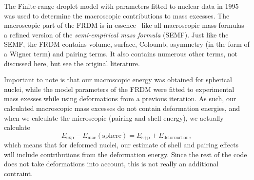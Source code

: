 The Finite-range droplet model with parameters fitted to nuclear data in 1995\cite{moller1995} was used to determine the macroscopic contributions to mass excesses. The macroscopic part of the FRDM is in essence-- like all macroscopic mass formulas-- a refined version of the \emph{semi-empirical mass formula} (SEMF). Just like the SEMF, the FRDM contains volume, surface, Coloumb, asymmetry (in the form of a Wigner term) and pairing terms. It also contains numerous other terms, not discussed here, but see the original literature\cite{moller1995}.

Important to note is that our macroscopic energy was obtained for spherical nuclei, while the model parameters of the FRDM were fitted to experimental mass exesses while using deformations from a previous iteration. As such, our calculated macroscopic mass excesses do not contain deformation energies, and when we calculate the microscopic (pairing and shell energy), we actually calculate
\begin{equation}
E_\text{exp} - E_\text{mac}(\text{sphere}) = E_{\text{s}+\text{p}} + E_\text{deformation},
\end{equation}
which means that for deformed nuclei, our estimate of shell and pairing effects will include contributions from the deformation energy.
Since the rest of the code does not take deformations into account, this is not really an additional contraint.%


